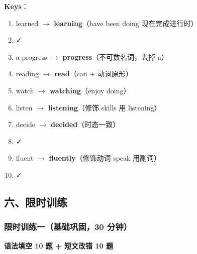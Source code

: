 \medskip

\textbf{Keys}：
\begin{enumerate}
  \item learned $\to$ \textbf{learning}（have been doing 现在完成进行时）
  \item ✓
  \item a progress $\to$ \textbf{progress}（不可数名词，去掉 a）
  \item reading $\to$ \textbf{read}（can + 动词原形）
  \item watch $\to$ \textbf{watching}（enjoy doing）
  \item listen $\to$ \textbf{listening}（修饰 skills 用 listening）
  \item decide $\to$ \textbf{decided}（时态一致）
  \item ✓
  \item fluent $\to$ \textbf{fluently}（修饰动词 speak 用副词）
  \item ✓
\end{enumerate}

\subsection{六、限时训练}

\subsubsection{限时训练一（基础巩固，30 分钟）}

\textbf{语法填空 10 题 + 短文改错 10 题}

